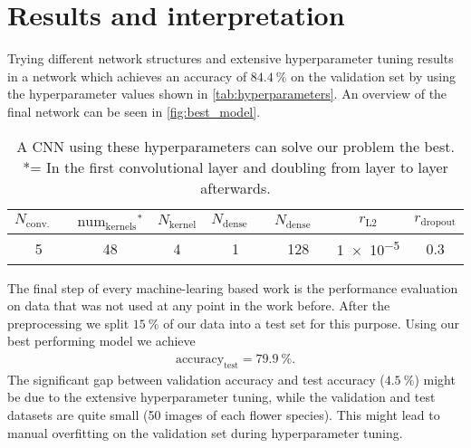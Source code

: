 \section{Results and interpretation}
\label{sec:results}
Trying different network structures and extensive hyperparameter tuning results in a network which achieves an accuracy of $\SI{84.4}{\percent}$ on the validation set by using the
hyperparameter values shown in \autoref{tab:hyperparameters}.
An overview of the final network can be seen in \autoref{fig:best_model}.
\begin{table}
    \centering
    \caption{A CNN using these hyperparameters can solve our problem the best. *= In the first convolutional layer and doubling from layer to layer afterwards.}
    \label{tab:hyperparameters}
    \begin{tabular}{c c c c c c c}
        \toprule
        $N_\text{conv. layers}$ & ${\text{num}_\text{kernels}}^*$ & $N_\text{kernel}$ & $N_\text{dense layers}$ & $N_\text{dense nodes}$ & $r_\text{L2}$ & $r_\text{dropout}$ \\
        \midrule
        5 & 48 & 4 & 1 & 128 & \num{1e-5} & 0.3\\
        \bottomrule
    \end{tabular}
\end{table}

The final step of every machine-learing based work is the performance evaluation on data that was not used at any point in the work before.
After the preprocessing we split $\SI{15}{\percent}$ of our data into a test set for this purpose.
Using our best performing model we achieve
\begin{align}
    \text{accuracy}_\text{test} = \SI{79.9}{\percent}.
\end{align}
The significant gap between validation accuracy and test accuracy ($\SI{4.5}{\percent}$) might be due to the extensive hyperparameter tuning, while the validation and test datasets are quite small 
(50 images of each flower species).
This might lead to manual overfitting on the validation set during hyperparameter tuning.

